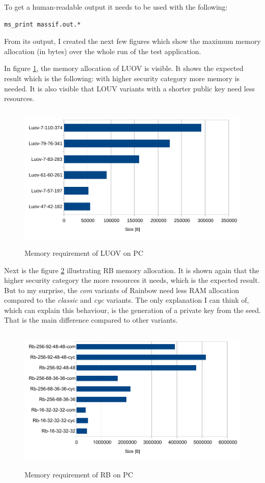 \documentclass[thesis=M,english]{FITthesis}[2019/12/23]
\begin{document}
\noindent
To get a human-readable output it needs to be used with the following:
\begin{lstlisting}[frame=single]
ms_print massif.out.*
\end{lstlisting}
\noindent
From its output, I created the next few figures which show the maximum memory allocation (in bytes) over the whole run of the test application.

\bigskip
\noindent
In figure \ref{mem-pc-luov}, the memory allocation of LUOV is visible. It shows the expected result which is the following: with higher security category more memory is needed. It is also visible that LOUV variants with a shorter public key need less resources. 

\begin{figure}[H]
\centering
\includegraphics[width=13cm,height=7cm]{images/mem-pc-luov.pdf}
\caption{Memory requirement of LUOV on PC}
\label{mem-pc-luov}
\end{figure}

\noindent
Next is the figure \ref{mem-pc-rb} illustrating RB memory allocation. It is shown again that the higher security category the more resources it needs, which is the expected result. But to my surprise, the \textit{com} variants of Rainbow need less RAM allocation compared to the \textit{classic} and \textit{cyc} variants. The only explanation I can think of, which can explain this behaviour, is the generation of a private key from the seed. That is the main difference compared to other variants.
\begin{figure}[H]
\centering
\includegraphics[width=13cm,height=7cm]{images/mem-pc-rb.pdf}
\caption{Memory requirement of RB on PC}
\label{mem-pc-rb}
\end{figure}
\end{document}
